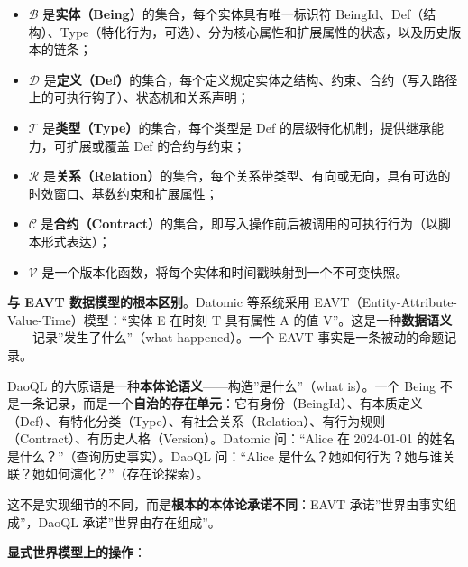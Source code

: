 \documentclass[11pt,a4paper]{ctexart}
\begin{document}
\begin{itemize}
\tightlist
\item
  \(\mathcal{B}\) 是\textbf{实体（Being）}的集合，每个实体具有唯一标识符
  \(\text{BeingId}\)、Def（结构）、Type（特化行为，可选）、分为核心属性和扩展属性的状态，以及历史版本的链条；
\item
  \(\mathcal{D}\)
  是\textbf{定义（Def）}的集合，每个定义规定实体之结构、约束、合约（写入路径上的可执行钩子）、状态机和关系声明；
\item
  \(\mathcal{T}\) 是\textbf{类型（Type）}的集合，每个类型是 Def
  的层级特化机制，提供继承能力，可扩展或覆盖 Def 的合约与约束；
\item
  \(\mathcal{R}\)
  是\textbf{关系（Relation）}的集合，每个关系带类型、有向或无向，具有可选的时效窗口、基数约束和扩展属性；
\item
  \(\mathcal{C}\)
  是\textbf{合约（Contract）}的集合，即写入操作前后被调用的可执行行为（以脚本形式表达）；
\item
  \(\mathcal{V}\)
  是一个版本化函数，将每个实体和时间戳映射到一个不可变快照。
\end{itemize}

\textbf{与 EAVT 数据模型的根本区别}。Datomic 等系统采用
EAVT（Entity-Attribute-Value-Time）模型：``实体 E 在时刻 T 具有属性 A
的值 V''。这是一种\textbf{数据语义}------记录''发生了什么''（what
happened）。一个 EAVT 事实是一条被动的命题记录。

DaoQL 的六原语是一种\textbf{本体论语义}------构造''是什么''（what
is）。一个 Being
不是一条记录，而是一个\textbf{自治的存在单元}：它有身份（BeingId）、有本质定义（Def）、有特化分类（Type）、有社会关系（Relation）、有行为规则（Contract）、有历史人格（Version）。Datomic
问：``Alice 在 2024-01-01 的姓名是什么？''（查询历史事实）。DaoQL
问：``Alice
是什么？她如何行为？她与谁关联？她如何演化？''（存在论探索）。

这不是实现细节的不同，而是\textbf{根本的本体论承诺不同}：EAVT
承诺''世界由事实组成''，DaoQL 承诺''世界由存在组成''。

\textbf{显式世界模型上的操作}：
\end{document}
